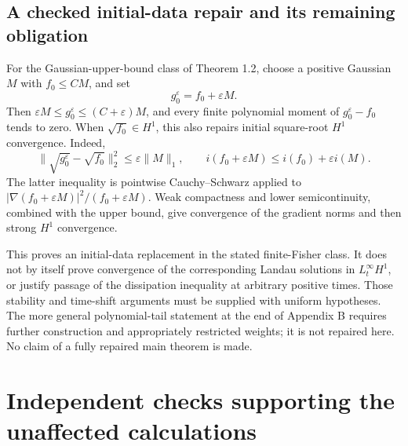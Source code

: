 \documentclass[10pt]{article}
\begin{document}
\subsection*{A checked initial-data repair and its remaining obligation}
For the Gaussian-upper-bound class of Theorem 1.2, choose a positive Gaussian \(M\) with \(f_0\leq C M\), and set \[g^\varepsilon_0=f_0+\varepsilon M.\] Then \(\varepsilon M\leq g^\varepsilon_0\leq(C+\varepsilon)M\), and every finite polynomial moment of \(g^\varepsilon_0-f_0\) tends to zero. When \(\sqrt{f_0}\in H^1\), this also repairs initial square-root \(H^1\) convergence. Indeed, \[\|\sqrt{g^\varepsilon_0}-\sqrt{f_0}\|_2^2
 \leq\varepsilon\|M\|_1,\qquad
 i(f_0+\varepsilon M)\leq i(f_0)+\varepsilon i(M).\] The latter inequality is pointwise Cauchy–Schwarz applied to \(|\nabla(f_0+\varepsilon M)|^2/(f_0+\varepsilon M)\). Weak compactness and lower semicontinuity, combined with the upper bound, give convergence of the gradient norms and then strong \(H^1\) convergence.\par
This proves an initial-data replacement in the stated finite-Fisher class. It does not by itself prove convergence of the corresponding Landau solutions in \(L^\infty_tH^1\), or justify passage of the dissipation inequality at arbitrary positive times. Those stability and time-shift arguments must be supplied with uniform hypotheses. The more general polynomial-tail statement at the end of Appendix B requires further construction and appropriately restricted weights; it is not repaired here. No claim of a fully repaired main theorem is made.\par
\section*{Independent checks supporting the unaffected calculations}
\end{document}
